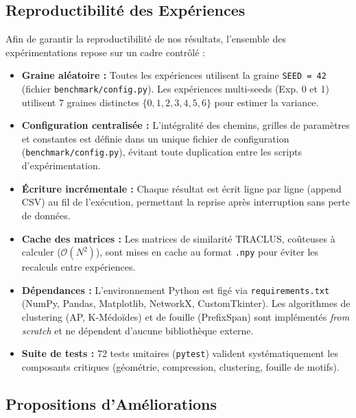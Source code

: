 \documentclass[11pt, a4paper]{article}
\begin{document}
\subsection{Reproductibilité des Expériences}
Afin de garantir la reproductibilité de nos résultats, l'ensemble des expérimentations repose sur un cadre contrôlé :
\begin{itemize}
    \item \textbf{Graine aléatoire :} Toutes les expériences utilisent la graine \texttt{SEED = 42} (fichier \texttt{benchmark/config.py}). Les expériences multi-seeds (Exp. 0 et 1) utilisent 7 graines distinctes $\{0, 1, 2, 3, 4, 5, 6\}$ pour estimer la variance.
    \item \textbf{Configuration centralisée :} L'intégralité des chemins, grilles de paramètres et constantes est définie dans un unique fichier de configuration (\texttt{benchmark/config.py}), évitant toute duplication entre les scripts d'expérimentation.
    \item \textbf{Écriture incrémentale :} Chaque résultat est écrit ligne par ligne (append CSV) au fil de l'exécution, permettant la reprise après interruption sans perte de données.
    \item \textbf{Cache des matrices :} Les matrices de similarité TRACLUS, coûteuses à calculer ($\mathcal{O}(N^2)$), sont mises en cache au format \texttt{.npy} pour éviter les recalculs entre expériences.
    \item \textbf{Dépendances :} L'environnement Python est figé via \texttt{requirements.txt} (NumPy, Pandas, Matplotlib, NetworkX, CustomTkinter). Les algorithmes de clustering (AP, K-Médoïdes) et de fouille (PrefixSpan) sont implémentés \textit{from scratch} et ne dépendent d'aucune bibliothèque externe.
    \item \textbf{Suite de tests :} 72 tests unitaires (\texttt{pytest}) valident systématiquement les composants critiques (géométrie, compression, clustering, fouille de motifs).
\end{itemize}

\subsection{Propositions d'Améliorations}
\end{document}
